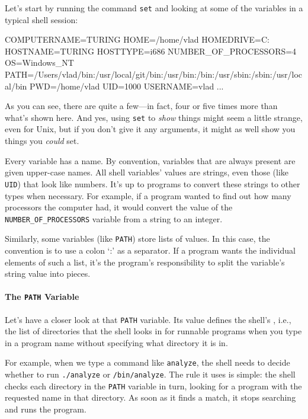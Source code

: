 \documentclass{book}
\begin{document}
Let's start by running the command \texttt{set} and looking at some of
the variables in a typical shell session:


\begin{VerbOut}
COMPUTERNAME=TURING
HOME=/home/vlad
HOMEDRIVE=C:
HOSTNAME=TURING
HOSTTYPE=i686
NUMBER_OF_PROCESSORS=4
OS=Windows_NT
PATH=/Users/vlad/bin:/usr/local/git/bin:/usr/bin:/bin:/usr/sbin:/sbin:/usr/local/bin
PWD=/home/vlad
UID=1000
USERNAME=vlad
...
\end{VerbOut}

As you can see, there are quite a few---in fact, four or five times more
than what's shown here. And yes, using \texttt{set} to \emph{show}
things might seem a little strange, even for Unix, but if you don't give
it any arguments, it might as well show you things you \emph{could} set.

Every variable has a name. By convention, variables that are always
present are given upper-case names. All shell variables' values are
strings, even those (like \texttt{UID}) that look like numbers. It's up
to programs to convert these strings to other types when necessary. For
example, if a program wanted to find out how many processors the
computer had, it would convert the value of the
\texttt{NUMBER\_OF\_PROCESSORS} variable from a string to an integer.

Similarly, some variables (like \texttt{PATH}) store lists of values. In
this case, the convention is to use a colon `:' as a separator. If a
program wants the individual elements of such a list, it's the program's
responsibility to split the variable's string value into pieces.

\mbox{}\paragraph{The \texttt{PATH} Variable}

Let's have a closer look at that \texttt{PATH} variable. Its value
defines the shell's , i.e., the
list of directories that the shell looks in for runnable programs when
you type in a program name without specifying what directory it is in.

For example, when we type a command like \texttt{analyze}, the shell
needs to decide whether to run \texttt{./analyze} or
\texttt{/bin/analyze}. The rule it uses is simple: the shell checks each
directory in the \texttt{PATH} variable in turn, looking for a program
with the requested name in that directory. As soon as it finds a match,
it stops searching and runs the program.
\end{document}
